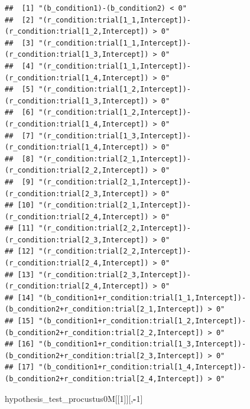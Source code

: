 \documentclass[
]{article}
\newenvironment{Shaded}{\begin{snugshade}}{\end{snugshade}}
\newcommand{\DecValTok}[1]{\textcolor[rgb]{0.00,0.00,0.81}{#1}}
\newcommand{\NormalTok}[1]{#1}
\newcommand{\SpecialCharTok}[1]{\textcolor[rgb]{0.81,0.36,0.00}{\textbf{#1}}}
\begin{document}
\begin{verbatim}
##  [1] "(b_condition1)-(b_condition2) < 0"                                                                  
##  [2] "(r_condition:trial[1_1,Intercept])-(r_condition:trial[1_2,Intercept]) > 0"                          
##  [3] "(r_condition:trial[1_1,Intercept])-(r_condition:trial[1_3,Intercept]) > 0"                          
##  [4] "(r_condition:trial[1_1,Intercept])-(r_condition:trial[1_4,Intercept]) > 0"                          
##  [5] "(r_condition:trial[1_2,Intercept])-(r_condition:trial[1_3,Intercept]) > 0"                          
##  [6] "(r_condition:trial[1_2,Intercept])-(r_condition:trial[1_4,Intercept]) > 0"                          
##  [7] "(r_condition:trial[1_3,Intercept])-(r_condition:trial[1_4,Intercept]) > 0"                          
##  [8] "(r_condition:trial[2_1,Intercept])-(r_condition:trial[2_2,Intercept]) > 0"                          
##  [9] "(r_condition:trial[2_1,Intercept])-(r_condition:trial[2_3,Intercept]) > 0"                          
## [10] "(r_condition:trial[2_1,Intercept])-(r_condition:trial[2_4,Intercept]) > 0"                          
## [11] "(r_condition:trial[2_2,Intercept])-(r_condition:trial[2_3,Intercept]) > 0"                          
## [12] "(r_condition:trial[2_2,Intercept])-(r_condition:trial[2_4,Intercept]) > 0"                          
## [13] "(r_condition:trial[2_3,Intercept])-(r_condition:trial[2_4,Intercept]) > 0"                          
## [14] "(b_condition1+r_condition:trial[1_1,Intercept])-(b_condition2+r_condition:trial[2_1,Intercept]) > 0"
## [15] "(b_condition1+r_condition:trial[1_2,Intercept])-(b_condition2+r_condition:trial[2_2,Intercept]) > 0"
## [16] "(b_condition1+r_condition:trial[1_3,Intercept])-(b_condition2+r_condition:trial[2_3,Intercept]) > 0"
## [17] "(b_condition1+r_condition:trial[1_4,Intercept])-(b_condition2+r_condition:trial[2_4,Intercept]) > 0"
\end{verbatim}

\begin{Shaded}
\begin{Highlighting}[]
\NormalTok{hypothesis\_test\_procustus0M[[}\DecValTok{1}\NormalTok{]][,}\SpecialCharTok{{-}}\DecValTok{1}\NormalTok{]}
\end{Highlighting}
\end{Shaded}
\end{document}
